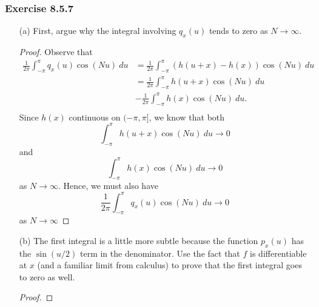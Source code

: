 \subsubsection{Exercise 8.5.7}  
\begin{enumerate}
    \item[(a)] First, argue why the integral involving \( q_{x}(u)  \) tends to zero as \( N \to \infty  \).
        \begin{proof}
            Observe that 
            \begin{align*}
              \frac{ 1 }{ 2 \pi }   \int_{ -\pi }^{ \pi  } q_{x}(u) \cos(Nu)  \ du &= \frac{ 1 }{ 2 \pi } \int_{ -\pi }^{ \pi  }  (h(u+x) - h(x)) \cos(Nu) \ du \\
                                                                                   &= \frac{ 1 }{  2\pi  } \int_{ -\pi  }^{ \pi  }  h(u+x) \cos(Nu)  \ du  \\ 
                                                                                   &- \frac{ 1 }{ 2 \pi } \int_{ -\pi }^{ \pi  } h(x) \cos(Nu)   \ du. \\
            \end{align*}
            Since \( h(x)  \) continuous on \( (-\pi,\pi] \), we know that both 
            \[  \int_{ -\pi }^{ \pi } h(u+x) \cos(Nu)  \ du \to 0  \] and
            \[  \int_{ -\pi  }^{ \pi  } h(x) \cos(Nu)  \ du \to 0\] as \( N \to \infty  \).  
            Hence, we must also have 
            \[  \frac{ 1 }{ 2 \pi } \int_{ -\pi  }^{ \pi  } q_{x}(u) \cos(Nu)  \ du \to 0  \] as \( N \to \infty  \)
            
        \end{proof} 
    \item[(b)] The first integral is a little more subtle because the function \( p_{x}(u)  \) has the \( \sin(u/2)  \) term in the denominator. Use the fact that \( f \) is differentiable at \( x  \) (and a familiar limit from calculus) to prove that the first integral goes to zero as well.
        \begin{proof}
        
        \end{proof}
\end{enumerate} 






